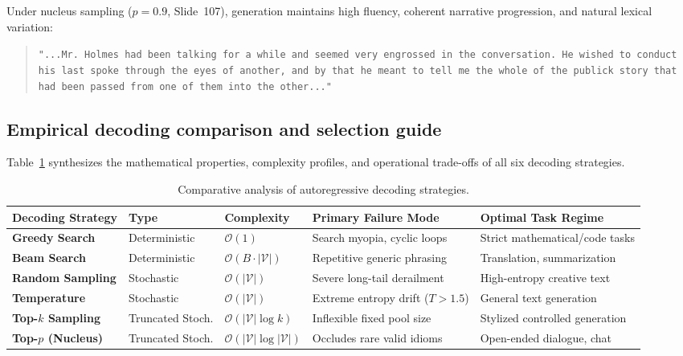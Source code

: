 \documentclass[../../main.tex]{subfiles}
\begin{document}
Under nucleus sampling ($p=0.9$, Slide~107), generation maintains high fluency, coherent narrative progression, and natural lexical variation:
\begin{quote}
\texttt{"...Mr. Holmes had been talking for a while and seemed very engrossed in the conversation. He wished to conduct his last spoke through the eyes of another, and by that he meant to tell me the whole of the publick story that had been passed from one of them into the other..."}
\end{quote}


\subsection{Empirical decoding comparison and selection guide}
\label{subsec:empirical_decoding_synthesis}

Table~\ref{tab:decoding_strategies_comparison} synthesizes the mathematical properties, complexity profiles, and operational trade-offs of all six decoding strategies.

\begin{table}[t]
\centering
\caption{Comparative analysis of autoregressive decoding strategies.}
\label{tab:decoding_strategies_comparison}
\begin{tabularx}{\textwidth}{l p{2.2cm} p{2.0cm} p{3.2cm} X}
\toprule
\textbf{Decoding Strategy} & \textbf{Type} & \textbf{Complexity} & \textbf{Primary Failure Mode} & \textbf{Optimal Task Regime} \\
\midrule
\textbf{Greedy Search} & Deterministic & $\mathcal{O}(1)$ & Search myopia, cyclic loops & Strict mathematical/code tasks \\
\textbf{Beam Search} & Deterministic & $\mathcal{O}(B \cdot |\mathcal{V}|)$ & Repetitive generic phrasing & Translation, summarization \\
\textbf{Random Sampling} & Stochastic & $\mathcal{O}(|\mathcal{V}|)$ & Severe long-tail derailment & High-entropy creative text \\
\textbf{Temperature} & Stochastic & $\mathcal{O}(|\mathcal{V}|)$ & Extreme entropy drift ($T > 1.5$) & General text generation \\
\textbf{Top-$k$ Sampling} & Truncated Stoch. & $\mathcal{O}(|\mathcal{V}| \log k)$ & Inflexible fixed pool size & Stylized controlled generation \\
\textbf{Top-$p$ (Nucleus)} & Truncated Stoch. & $\mathcal{O}(|\mathcal{V}| \log |\mathcal{V}|)$ & Occludes rare valid idioms & Open-ended dialogue, chat \\
\bottomrule
\end{tabularx}
\end{table}
\end{document}
